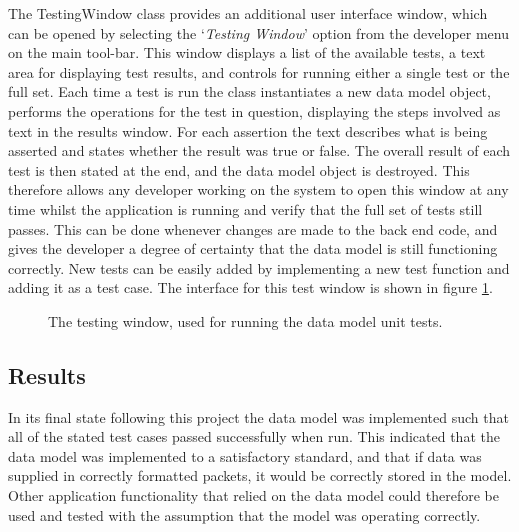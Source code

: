The TestingWindow class provides an additional user interface window, which can be opened by selecting the `\textit{Testing Window}' option from the developer menu on the main tool-bar. This window displays a list of the available tests, a text area for displaying test results, and controls for running either a single test or the full set. Each time a test is run the class instantiates a new data model object, performs the operations for the test in question, displaying the steps involved as text in the results window. For each assertion the text describes what is being asserted and states whether the result was true or false. The overall result of each test is then stated at the end, and the data model object is destroyed. This therefore allows any developer working on the system to open this window at any time whilst the application is running and verify that the full set of tests still passes. This can be done whenever changes are made to the back end code, and gives the developer a degree of certainty that the data model is still functioning correctly. New tests can be easily added by implementing a new test function and adding it as a test case. The interface for this test window is shown in figure \ref{fig:TestingWindow}.

\begin{figure}
 \centering
 \decoRule
 \caption[Testing Window]{The testing window, used for running the data model unit tests.}
 \label{fig:TestingWindow}
\end{figure}

\subsection{Results}
In its final state following this project the data model was implemented such that all of the stated test cases passed successfully when run. This indicated that the data model was implemented to a satisfactory standard, and that if data was supplied in correctly formatted packets, it would be correctly stored in the model. Other application functionality that relied on the data model could therefore be used and tested with the assumption that the model was operating correctly.

